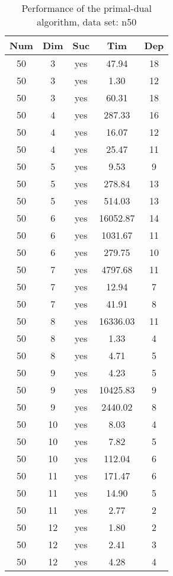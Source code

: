\begin{table}[!htb]
  \centering
  \begin{tabular}[center]{|c|c|c|c|c|}
    \hline
    Num & Dim & Suc & Tim & Dep \\
    \hline
    50 & 3 & yes & 47.94 & 18 \\
    50 & 3 & yes & 1.30 & 12 \\
    50 & 3 & yes & 60.31 & 18 \\
    50 & 4 & yes & 287.33 & 16 \\
    50 & 4 & yes & 16.07 & 12 \\
    50 & 4 & yes & 25.47 & 11 \\
    50 & 5 & yes & 9.53 & 9 \\
    50 & 5 & yes & 278.84 & 13 \\
    50 & 5 & yes & 514.03 & 13 \\
    50 & 6 & yes & 16052.87 & 14 \\
    50 & 6 & yes & 1031.67 & 11 \\
    50 & 6 & yes & 279.75 & 10 \\
    50 & 7 & yes & 4797.68 & 11 \\
    50 & 7 & yes & 12.94 & 7 \\
    50 & 7 & yes & 41.91 & 8 \\
    50 & 8 & yes & 16336.03 & 11 \\
    50 & 8 & yes & 1.33 & 4 \\
    50 & 8 & yes & 4.71 & 5 \\
    50 & 9 & yes & 4.23 & 5 \\
    50 & 9 & yes & 10425.83 & 9 \\
    50 & 9 & yes & 2440.02 & 8 \\
    50 & 10 & yes & 8.03 & 4 \\
    50 & 10 & yes & 7.82 & 5 \\
    50 & 10 & yes & 112.04 & 6 \\
    50 & 11 & yes & 171.47 & 6 \\
    50 & 11 & yes & 14.90 & 5 \\
    50 & 11 & yes & 2.77 & 2 \\
    50 & 12 & yes & 1.80 & 2 \\
    50 & 12 & yes & 2.41 & 3 \\
    50 & 12 & yes & 4.28 & 4 \\
    \hline
  \end{tabular}
  \caption{Performance of the primal-dual algorithm, data set: n50}
  \label{tab:test.pd-n50}
\end{table}

